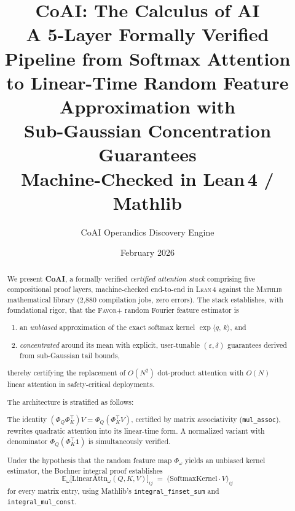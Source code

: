 \documentclass[11pt,a4paper]{article}
\title{%
  \textbf{CoAI: The Calculus of AI} \\[4pt]
  \large A 5-Layer Formally Verified Pipeline from Softmax Attention \\
  to Linear-Time Random Feature Approximation with \\
  Sub-Gaussian Concentration Guarantees \\[8pt]
  \normalsize Machine-Checked in Lean\,4 / Mathlib
}
\author{%
  CoAI Operandics Discovery Engine
}
\date{February 2026}
\newcommand{\E}{\mathbb{E}}
\newcommand{\favor}{\textsc{Favor+}}
\newcommand{\lean}{\textsc{Lean\,4}}
\newcommand{\mathlib}{\textsc{Mathlib}}
\newcommand{\ip}[2]{\langle #1,\, #2 \rangle}
\begin{document}
\maketitle
\thispagestyle{empty}

\begin{abstract}

We present \textbf{CoAI}, a formally verified \emph{certified attention stack}
comprising five compositional proof layers, machine-checked end-to-end in
\lean{} against the \mathlib{} mathematical library (2,880 compilation jobs,
zero errors).  The stack establishes, with foundational rigor, that the
\favor{} random Fourier feature estimator is
\begin{enumerate}[label=(\roman*),nosep]
  \item an \emph{unbiased} approximation of the exact softmax kernel
        $\exp\!\ip{q}{k}$, and
  \item \emph{concentrated} around its mean with explicit, user-tunable
        $(\varepsilon,\delta)$ guarantees derived from sub-Gaussian tail
        bounds,
\end{enumerate}
thereby certifying the replacement of $O(N^2)$ dot-product attention with
$O(N)$ linear attention in safety-critical deployments.

\medskip\noindent
The architecture is stratified as follows:

\begin{description}[style=nextline, leftmargin=2em, font=\normalfont\itshape]
  \item[Layer 0 — Algebraic Factorization.]
    The identity $(\Phi_Q \Phi_K^\top) V = \Phi_Q (\Phi_K^\top V)$, certified
    by matrix associativity (\texttt{mul\_assoc}), rewrites quadratic attention
    into its linear-time form.  A normalized variant with denominator
    $\Phi_Q (\Phi_K^\top \mathbf{1})$ is simultaneously verified.

  \item[Layer 1 — Structural Bridge (Bochner Integral).]
    Under the hypothesis that the random feature map $\Phi_\omega$ yields an
    unbiased kernel estimator, the Bochner integral proof establishes
    \[
      \E_\omega\!\bigl[\text{LinearAttn}_\omega(Q,K,V)\bigr]_{ij}
      \;=\;
      \bigl(\text{SoftmaxKernel} \cdot V\bigr)_{ij}
    \]
    for every matrix entry, using Mathlib's \texttt{integral\_finset\_sum}
    and \texttt{integral\_mul\_const}.


\end{description}
\end{abstract}
\end{document}

